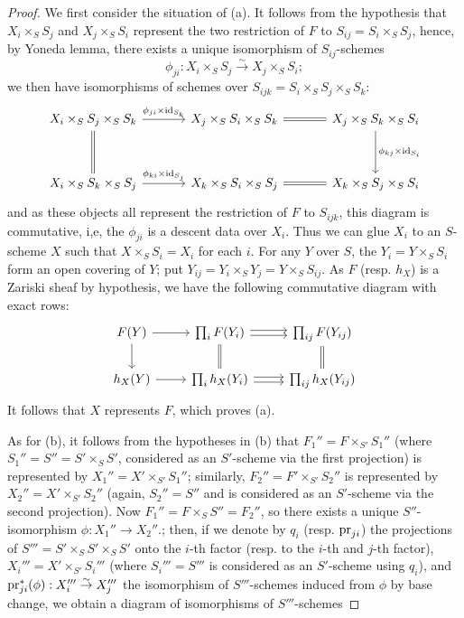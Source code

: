 \begin{proof}
We first consider the situation of (a). It follows from the hypothesis that $X_i\times_SS_j$ and $X_j\times_SS_i$ represent the two restriction of $F$ to $S_{ij}=S_i\times_SS_j$, hence, by Yoneda lemma, there exists a unique isomorphism of $S_{ij}$-schemes
\[\phi_{ji}:X_i\times_SS_j\stackrel{\sim}{\to} X_j\times_SS_i;\]
we then have isomorphisms of schemes over $S_{ijk}=S_i\times_SS_j\times_SS_k$:
\[\begin{tikzcd}[row sep=12mm, column sep=12mm]
X_i\times_SS_j\times_SS_k\ar[d,equal]\ar[r,"\phi_{ji}\times\id_{S_k}"]&X_j\times_SS_i\times_SS_k\ar[r,equal]&X_j\times_SS_k\times_SS_i\ar[d,"\phi_{kj}\times\id_{S_i}"]\\
X_i\times_SS_k\times_SS_j\ar[r,"\phi_{ki}\times\id_{S_j}"]&X_k\times_SS_i\times_SS_j\ar[r,equal]&X_k\times_SS_j\times_SS_i
\end{tikzcd}\]
and as these objects all represent the restriction of $F$ to $S_{ijk}$, this diagram is commutative, i,e, the $\phi_{ji}$ is a descent data over $X_i$. Thus we can glue $X_i$ to an $S$-scheme $X$ such that $X\times_SS_i=X_i$ for each $i$. For any $Y$ over $S$, the $Y_i=Y\times_SS_i$ form an open covering of $Y$; put $Y_{ij}=Y_i\times_SY_j=Y\times_SS_{ij}$. As $F$ (resp. $h_X$) is a Zariski sheaf by hypothesis, we have the following commutative diagram with exact rows:
\[\begin{tikzcd}
F(Y)\ar[r]\ar[d]&\prod_iF(Y_i)\ar[r,shift left=2pt]\ar[r,shift right=2pt]\ar[d,equal]&\prod_{ij}F(Y_{ij})\ar[d,equal]\\
h_X(Y)\ar[r]&\prod_ih_X(Y_i)\ar[r,shift left=2pt]\ar[r,shift right=2pt]&\prod_{ij}h_X(Y_{ij})
\end{tikzcd}\]
It follows that $X$ represents $F$, which proves (a).\par
As for (b), it follows from the hypotheses in (b) that $F_1''=F\times_{S'}S_1''$ (where $S_1''=S''=S'\times_SS'$, considered as an $S'$-scheme via the first projection) is represented by $X_1''=X'\times_{S'}S_1''$; similarly, $F_2''=F'\times_{S'}S_2''$ is represented by $X_2''=X'\times_{S'}S_2''$ (again, $S_2''=S''$ and is considered as an $S'$-scheme via the second projection). Now $F_1''=F\times_SS''=F_2''$, so there exists a unique $S''$-isomorphism $\phi:X_1''\to X_2''$.; then, if we denote by $q_i$ (resp. $\mathrm{pr}_{ji}$) the projections of $S'''=S'\times_SS'\times_SS'$ onto the $i$-th factor (resp. to the $i$-th and $j$-th factor), $X_i'''=X'\times_{S'}S_i'''$ (where $S_i'''=S'''$ is considered as an $S'$-scheme using $q_i$), and $\mathrm{pr}_{ji}^*(\phi):X_i'''\stackrel{\sim}{\to}X_j'''$ the isomorphism of $S'''$-schemes induced from $\phi$ by base change, we obtain a diagram of isomorphisms of $S'''$-schemes

\end{proof}
